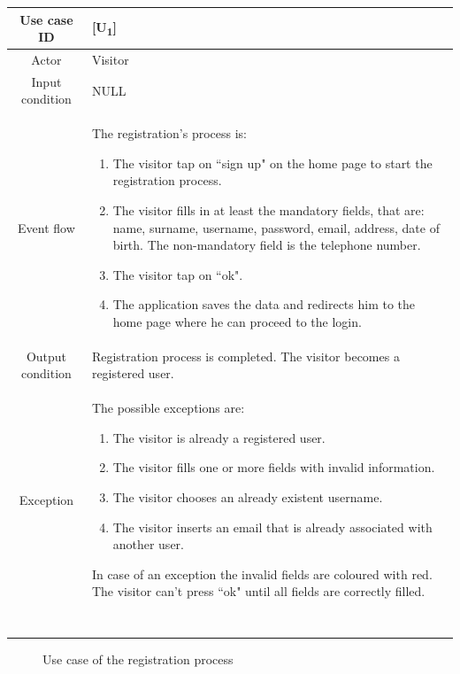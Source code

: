 \documentclass[12pt,titlepage]{article}
\begin{document}
\begin{tabular}{cp{10cm}} 
Use case ID& {[U\textsubscript{1}]}\\ \hline
Actor&Visitor\\ \hline 

Input condition&NULL \\ \hline
Event flow&The registration's process is: \begin{enumerate}
\item The visitor tap on ``sign up" on the home page to start the registration process.
\item The visitor fills in at least the mandatory fields, that are: name, surname, username, password, email, address, date of birth. The non-mandatory field is the telephone number.
\item The visitor tap on ``ok".
\item The application saves the data and redirects him to the home page where he can proceed to the login.
\end{enumerate} \\ \hline
Output condition&Registration process is completed. The visitor becomes a registered user. \\ \hline
Exception& The possible exceptions are:
\begin{enumerate}
\item The visitor is already a registered user.
\item The visitor fills one or more fields with invalid information.
\item The visitor chooses an already existent username.
\item The visitor inserts an email that is already associated with another user.
\end{enumerate} 
In case of an exception the invalid fields are coloured with red. The visitor can't press ``ok" until all fields are correctly filled.\\ \hline \

\end{tabular}

\pagebreak

\begin{figure}
\centering
{}
\caption{Use case of the registration process}

\end{figure}
\end{document}
